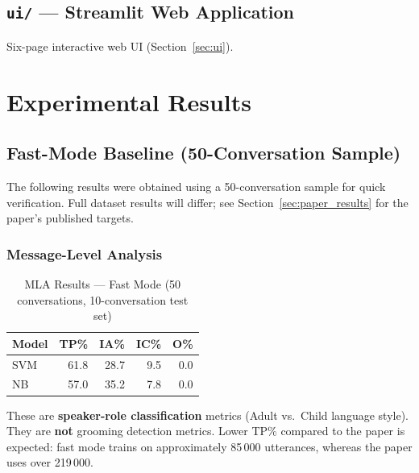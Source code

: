 \documentclass[12pt,a4paper]{article}
\begin{document}
\subsection{\texttt{ui/} --- Streamlit Web Application}

Six-page interactive web UI (Section~\ref{sec:ui}).

\section{Experimental Results}

\subsection{Fast-Mode Baseline (50-Conversation Sample)}

The following results were obtained using a 50-conversation sample for
quick verification. Full dataset results will differ; see
Section~\ref{sec:paper_results} for the paper's published targets.

\subsubsection{Message-Level Analysis}

\begin{table}[H]
  \centering
  \caption{MLA Results --- Fast Mode (50 conversations, 10-conversation test set)}
  \begin{tabular}{lrrrr}
    \toprule
    \textbf{Model} & \textbf{TP\%} & \textbf{IA\%} & \textbf{IC\%} &
    \textbf{O\%} \\
    \midrule
    SVM & 61.8 & 28.7 & 9.5 & 0.0 \\
    NB  & 57.0 & 35.2 & 7.8 & 0.0 \\
    \bottomrule
  \end{tabular}
  \label{tab:mla_fast}
\end{table}

\begin{infobox}
These are \textbf{speaker-role classification} metrics (Adult vs.\ Child
language style). They are \textbf{not} grooming detection metrics. Lower
TP\% compared to the paper is expected: fast mode trains on approximately
85\,000 utterances, whereas the paper uses over 219\,000.
\end{infobox}
\end{document}
